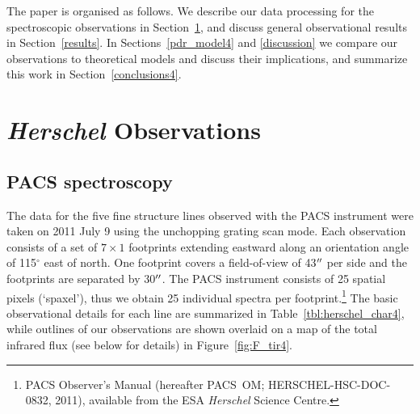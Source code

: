 The paper is organised as follows.  We describe our data processing for the spectroscopic observations in Section~\ref{Herschel_obs4}, and discuss general observational results in Section~\ref{results}. In Sections~\ref{pdr_model4} and \ref{discussion} we compare our observations to theoretical models and discuss their implications, and summarize this work in Section~\ref{conclusions4}.

\section{\emph{Herschel} Observations}\label{Herschel_obs4}

\subsection{PACS spectroscopy}\label{pacs_spec}
The data for the five fine structure lines observed with the PACS instrument were taken on 2011 July 9 using the unchopping grating scan mode.  Each observation consists of a set of $7 \times 1$ footprints extending eastward along an orientation angle of 115$^{\circ}$ east of north.  One footprint covers a field-of-view of 43$\mbox{$^{\prime\prime}$}$ per side and the footprints are separated by 30$\mbox{$^{\prime\prime}$}$.  The PACS instrument consists of 25 spatial pixels (`spaxel'), thus we obtain 25 individual spectra per footprint.\footnote{PACS Observer's Manual (hereafter PACS~OM; HERSCHEL-HSC-DOC-0832, 2011), available from the ESA \emph{Herschel} Science Centre.}
The basic observational details for each line are summarized in Table~\ref{tbl:herschel_char4}, while outlines of our observations are shown overlaid on a map of the total infrared flux (see below for details) in Figure~\ref{fig:F_tir4}.

